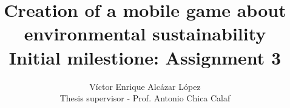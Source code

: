 

\title{Creation of a mobile game about environmental sustainability \\
 \large Initial milestione: Assignment 3}

\author{Víctor Enrique Alcázar López \\
	Thesis supervisor - Prof. Antonio Chica Calaf}


\maketitle
\tableofcontents






